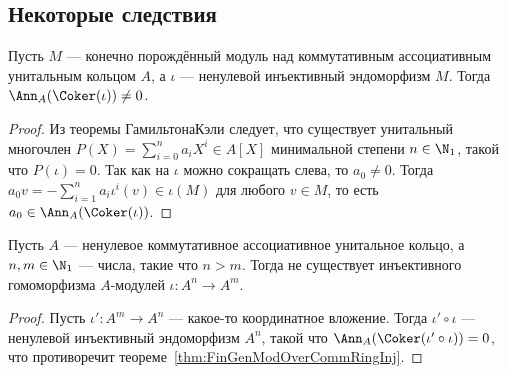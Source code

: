 \documentclass[
	extrafontsizes,
	11pt,
	hyphens,
]{memoir}
\begin{document}
\subsection{Некоторые следствия}

\begin{theorem}
Пусть \(M\) --- конечно порождённый модуль над коммутативным ассоциативным унитальным кольцом \(A\),
а \(\iota\) --- ненулевой инъективный эндоморфизм \(M\).
\label{thm:FinGenModOverCommRingInj}
Тогда \(\Ann_A(\Coker(\iota)) \neq 0\).
\end{theorem}

\begin{proof}
Из теоремы Гамильтона\namedash{}Кэли следует, что существует унитальный многочлен \(P(X) = \sum_{i=0}^n a_i X^i \in A[X]\) минимальной степени \(n \in \N_1\),
такой что \(P(\iota) = 0\).
Так как на \(\iota\) можно сокращать слева, то \(a_0 \neq 0\).
Тогда \(a_0 v = -\sum_{i=1}^n a_i \iota^i(v) \in \iota(M)\) для любого \(v \in M\), то есть \(a_0 \in \Ann_A(\Coker(\iota))\).
\end{proof}

\begin{corollary}
Пусть \(A\) --- ненулевое коммутативное ассоциативное унитальное кольцо, а \(n, m \in \N_1\) --- числа, такие что \(n > m\). Тогда не существует инъективного гомоморфизма \(A\)-модулей \(\iota : A^n \to A^m\).
\end{corollary}

\begin{proof}
Пусть \(\iota' : A^m \to A^n\) --- какое-то координатное вложение. Тогда \(\iota' \circ \iota\) --- ненулевой инъективный эндоморфизм \(A^n\),
такой что \(\Ann_A(\Coker(\iota' \circ \iota)) = 0\),
что противоречит теореме~\ref{thm:FinGenModOverCommRingInj}.
\end{proof}

\end{document}
